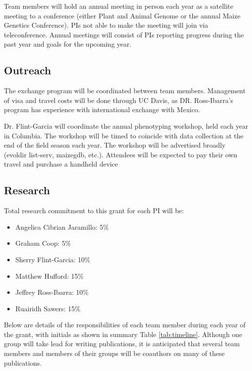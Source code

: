 Team members will hold an annual meeting in person each year as a satellite meeting to a conference (either Plant and Animal Genome or the annual Maize Genetics Conference).  PIs not able to make the meeting will join via teleconference.  Annual meetings will consist of PIs reporting progress during the past year and goals for the upcoming year. 

\subsection*{Outreach} 

The exchange program will be coordinated between team members.  Management of visa and travel costs will be done through UC Davis, as DR. Ross-Ibarra's program has experience with international exchange with Mexico.  

Dr. Flint-Garcia will coordinate the annual phenotyping workshop, held each year in Columbia.  The workshop will be timed to coincide with data collection at the end of the field season each year. The workshop will be advertised broadly (evoldir list-serv, maizegdb, etc.).  Attendees will be expected to pay their own travel and purchase a handheld device

\subsection*{Research}

Total research commitment to this grant for each PI will be:
\begin{itemize}
\item Angelica Cibrian Jaramillo: 5\%
\item Graham Coop: 5\%
\item Sherry Flint-Garcia: 10\%
\item Matthew Hufford: 15\%
\item Jeffrey Ross-Ibarra: 10\%
\item Ruairidh Sawers: 15\%
\end{itemize} 
Below are details of the responsibilities of each team member during each year of the grant, with initials as shown in summary Table \ref{tab:timeline}. Although one group will take lead for writing publications, it is anticipated that several team members and members of their groups will be coauthors on many of these publications.
\clearpage


